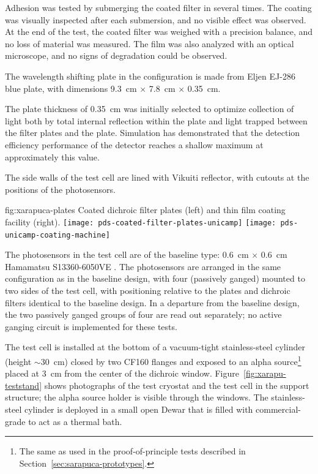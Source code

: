 Adhesion was tested by submerging the coated filter in  several times. The coating was visually inspected after each submersion, and no visible effect was observed. At the end of the test, the coated filter was weighed with a precision balance, and no loss of material was measured. The film was also analyzed with an optical microscope, and no signs of degradation could be observed. 

The wavelength shifting plate in the  configuration is made from Eljen EJ-286 blue  plate, with dimensions \SI{9.3}{cm} $\times$ \SI{7.8}{cm} $\times$ \SI{0.35}{cm}.  

The  plate thickness of \SI{0.35}{cm} was initially selected to optimize collection of light both by total internal reflection within the  plate and light trapped between the filter plates and the  plate.  Simulation has demonstrated that the detection efficiency performance of the detector reaches a shallow maximum at approximately this value.

The side walls of the test cell are lined with Vikuiti reflector, with cutouts at the positions of the photosensors.

\begin{dunefigure}{fig:xarapuca-plates}
{Coated dichroic filter plates (left) and  thin film coating facility (right).} 
	\texttt{[image: pds-coated-filter-plates-unicamp]}\quad
	\texttt{[image: pds-unicamp-coating-machine]}
\end{dunefigure}

The photosensors in the test cell are of the baseline type:  \SI{0.6}{cm} $\times$ \SI{0.6}{cm} Hamamatsu S13360-6050VE .  The photosensors are arranged in the same configuration as in the baseline design, with four  (passively ganged) mounted to two sides of the test cell, with positioning relative to the  plates and dichroic filters identical to the baseline design.  In a departure from the baseline design, the two passively ganged groups of four  are read out separately; no active ganging circuit is implemented for these tests. 

The test cell is installed at the bottom of a vacuum-tight stainless-steel cylinder (height $\sim$\SI{30}{cm}) closed by two CF160 flanges and exposed to an alpha source\footnote{The same as used in the  proof-of-principle tests described in Section~\ref{sec:sarapuca-prototypes}.} 
placed at \SI{3}{cm} from the center of the dichroic window. Figure~\ref{fig:xarapu-teststand} shows photographs of the test cryostat and the test cell in the support structure; the alpha source holder is visible through the windows.
The stainless-steel cylinder  is deployed in a small open Dewar that is filled with commercial-grade  to act as a thermal bath.


